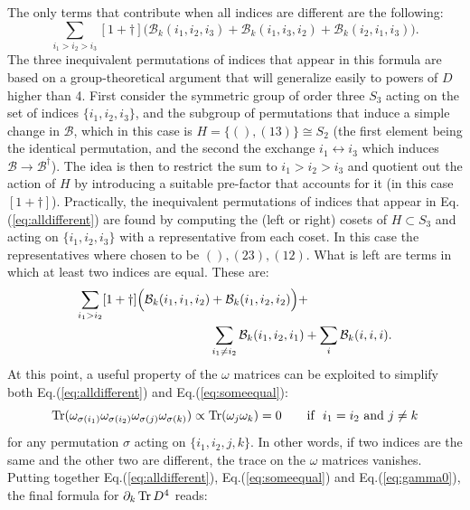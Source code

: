 The only terms that contribute when all indices are different are the following:
\begin{equation} \label{eq:alldifferent}
\sum_{i_1 > i_2 > i_3} [1+\dagger] \Big( \mathcal{B}_k(i_1, i_2, i_3) + \mathcal{B}_k(i_1, i_3, i_2) + \mathcal{B}_k(i_2, i_1, i_3) \Big).
\end{equation}
The three inequivalent permutations of indices that appear in this formula are based on a group-theoretical argument that will generalize easily to powers of $D$ higher than 4. First consider the symmetric group of order three $S_3$ acting on the set of indices $\{i_1, i_2, i_3\}$, and the subgroup of permutations that induce a simple change in $\mathcal{B}$, which in this case is $H = \{(), (13)\} \cong S_2$ (the first element being the identical permutation, and the second the exchange $i_1 \leftrightarrow i_3$ which induces $\mathcal{B} \rightarrow \mathcal{B}^\dagger$). The idea is then to restrict the sum to $i_1 > i_2 > i_3$ and quotient out the action of $H$ by introducing a suitable pre-factor that accounts for it (in this case $[1+\dagger]$). Practically, the inequivalent permutations of indices that appear in Eq.(\ref{eq:alldifferent}) are found by computing the (left or right) cosets of $H \subset S_3$ and acting on $\{i_1, i_2, i_3\}$ with a representative from each coset. In this case the representatives where chosen to be $(), (23), (12)$.\newline
What is left are terms in which at least two indices are equal. These are:
\begin{align} \label{eq:someequal}
\sum_{i_1 > i_2} [1+\dagger] \Big( \mathcal{B}_k(i_1, i_1, i_2) &+ \mathcal{B}_k(i_1, i_2, i_2) \Big) + \notag \\
&\sum_{i_1 \neq i_2} \mathcal{B}_k(i_1, i_2, i_1) + \sum_{i} \mathcal{B}_k(i,i,i).
\end{align}
At this point, a useful property of the $\omega$ matrices can be exploited to simplify both Eq.(\ref{eq:alldifferent}) and Eq.(\ref{eq:someequal}):
\begin{equation}\label{eq:gamma0}
\operatorname{Tr}(\omega_{\sigma(i_1)} \omega_{\sigma(i_2)} \omega_{\sigma(j)} \omega_{\sigma(k)}) \propto \operatorname{Tr}(\omega_j \omega_k) = 0 \qquad \text{if} \ \ i_1 = i_2 \ \text{and} \ j \neq k
\end{equation}
for any permutation $\sigma$ acting on $\{i_1, i_2, j, k\}$. In other words, if two indices are the same and the other two are different, the trace on the $\omega$ matrices vanishes.\newline
Putting together Eq.(\ref{eq:alldifferent}), Eq.(\ref{eq:someequal}) and Eq.(\ref{eq:gamma0}), the final formula for $\partial_k \operatorname{Tr} D^4$ reads:
